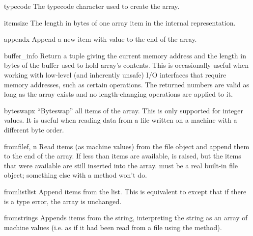 \begin{datadesc}{typecode}
The typecode character used to create the array.
\end{datadesc}

\begin{datadesc}{itemsize}
The length in bytes of one array item in the internal representation.
\end{datadesc}


\begin{funcdesc}{append}{x}
Append a new item with value  to the end of the array.
\end{funcdesc}

\begin{funcdesc}{buffer_info}{}
Return a tuple  giving the current
memory address and the length in bytes of the buffer used to hold
array's contents.  This is occasionally useful when working with
low-level (and inherently unsafe) I/O interfaces that require memory
addresses, such as certain  operations.  The returned
numbers are valid as long as the array exists and no length-changing
operations are applied to it.
\end{funcdesc}

\begin{funcdesc}{byteswap}{x}
``Byteswap'' all items of the array.  This is only supported for
integer values.  It is useful when reading data from a file written
on a machine with a different byte order.
\end{funcdesc}

\begin{funcdesc}{fromfile}{f, n}
Read  items (as machine values) from the file object 
and append them to the end of the array.  If less than  items
are available,  is raised, but the items that were
available are still inserted into the array.   must be a real
built-in file object; something else with a  method won't
do.
\end{funcdesc}

\begin{funcdesc}{fromlist}{list}
Append items from the list.  This is equivalent to
except that if there is a type error, the array is unchanged.
\end{funcdesc}

\begin{funcdesc}{fromstring}{s}
Appends items from the string, interpreting the string as an
array of machine values (i.e. as if it had been read from a
file using the  method).
\end{funcdesc}


